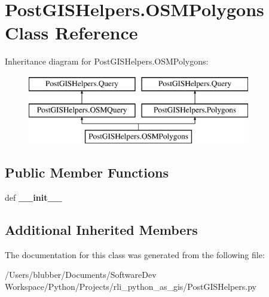 \hypertarget{class_post_g_i_s_helpers_1_1_o_s_m_polygons}{}\section{Post\+G\+I\+S\+Helpers.\+O\+S\+M\+Polygons Class Reference}
\label{class_post_g_i_s_helpers_1_1_o_s_m_polygons}
Inheritance diagram for Post\+G\+I\+S\+Helpers.\+O\+S\+M\+Polygons\+:\begin{figure}[H]
\begin{center}
\leavevmode
\includegraphics[height=3.000000cm]{class_post_g_i_s_helpers_1_1_o_s_m_polygons}
\end{center}
\end{figure}
\subsection*{Public Member Functions}
\begin{DoxyCompactItemize}
\item 
\hypertarget{class_post_g_i_s_helpers_1_1_o_s_m_polygons_a79bddc2532ce28deef345ad80a6dfc4a}{}def {\bfseries \+\_\+\+\_\+init\+\_\+\+\_\+}\label{class_post_g_i_s_helpers_1_1_o_s_m_polygons_a79bddc2532ce28deef345ad80a6dfc4a}

\end{DoxyCompactItemize}
\subsection*{Additional Inherited Members}


The documentation for this class was generated from the following file\+:\begin{DoxyCompactItemize}
\item 
/\+Users/blubber/\+Documents/\+Software\+Dev Workspace/\+Python/\+Projects/rli\+\_\+python\+\_\+as\+\_\+gis/Post\+G\+I\+S\+Helpers.\+py\end{DoxyCompactItemize}
